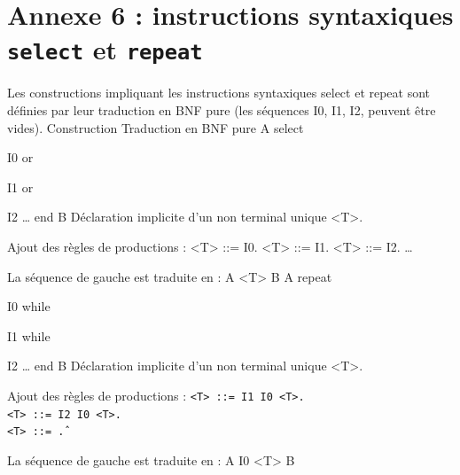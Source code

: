\section{Annexe 6 : instructions syntaxiques \texttt{select} et \texttt{repeat}}

Les constructions impliquant les instructions syntaxiques select et repeat sont définies par leur traduction en BNF pure (les séquences I0, I1, I2, peuvent être vides).
Construction	Traduction en BNF pure
A
select

I0
or

I1
or

I2
…
end
B	Déclaration implicite d'un non terminal unique <T>.

Ajout des règles de productions :
<T> ::= I0.
<T> ::= I1.
<T> ::= I2.
…

La séquence de gauche est traduite en : A <T> B
A
repeat

I0
while

I1
while

I2
…
end
B	Déclaration implicite d'un non terminal unique <T>.

Ajout des règles de productions :
\texttt{<T> ::= I1 I0 <T>.\\<T> ::= I2 I0 <T>.\\<T> ::= \^.}

La séquence de gauche est traduite en : A I0 <T> B
